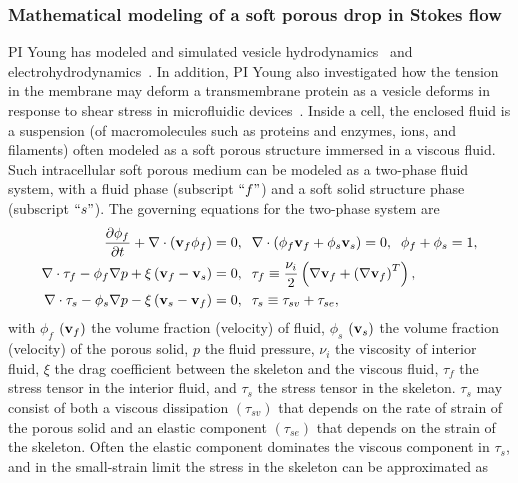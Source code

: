 \documentclass[11pt]{article}
\begin{document}
\subsubsection{Mathematical modeling of a soft porous drop in Stokes
flow} 
\label{subsubsec:math_modeling}
PI Young has modeled and simulated vesicle
hydrodynamics~\cite{Veerapaneni2011_PRL, Vlahovska2011_JFM} and
electrohydrodynamics~\cite{HuLai2016_JCP, Nganguia2013_PRE}.  In
addition, PI Young also investigated how the tension in the membrane may
deform a transmembrane protein as a vesicle deforms in response to shear
stress in microfluidic devices~\cite{Pak2015_PNAS, Peng2016_AMS}. Inside
a cell, the enclosed fluid is a suspension (of macromolecules such as
proteins and enzymes, ions, and filaments) often modeled as a soft
porous structure immersed in a viscous fluid.  Such intracellular soft
porous medium can be modeled as a two-phase fluid system, with a fluid
phase (subscript $``f"$) and a soft solid structure phase (subscript
$``s"$).  The governing equations for the two-phase system are
\begin{align}
\label{eq:geq1}
\frac{\partial \phi_f}{\partial t} + \nabla \cdot \left({\bf v}_f \phi_f\right) &= 0,\;\; \nabla \cdot \left(\phi_f {\bf v}_f + \phi_s {\bf v}_s \right) =0,\;\;\phi_f + \phi_s = 1,\\
\label{eq:geq2}
\nabla \cdot {\tau}_f -\phi_f \nabla p +\xi\left({\bf v}_f - {\bf v}_s\right) &=0,\;\; \tau_f\equiv \frac{\nu_i}{2}\left(\nabla {\bf v}_f + \left(\nabla{\bf v}_f\right)^T\right), \\
\label{eq:geq3}
\nabla \cdot {\tau}_s-\phi_s \nabla p -\xi \left({\bf v}_s - {\bf v}_f\right) &=0,\;\; \tau_s\equiv \tau_{sv}+\tau_{se},
\end{align}
with $\phi_f$ $({\bf v}_f)$ the volume fraction (velocity) of fluid,
$\phi_s$  $({\bf v}_s)$ the volume fraction (velocity) of the porous
solid, $p$ the fluid pressure, $\nu_i$ the viscosity of interior fluid,
$\xi$ the drag coefficient between the skeleton and the viscous fluid,
$\tau_f$  the stress tensor in the interior fluid, and $\tau_s$ the
stress tensor in the skeleton. $\tau_s$ may consist of both a viscous
dissipation $(\tau_{sv})$ that depends on the rate of strain of the
porous solid and an elastic component $(\tau_{se})$ that depends on the
strain of the skeleton.  Often the elastic component dominates the
viscous component in $\tau_s$,  and in the small-strain limit the stress
in the skeleton can be approximated as
\end{document}
